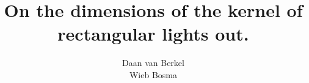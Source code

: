 \title{On the dimensions of the kernel of rectangular lights out.}
\author{Daan van Berkel\\Wieb Bosma}
